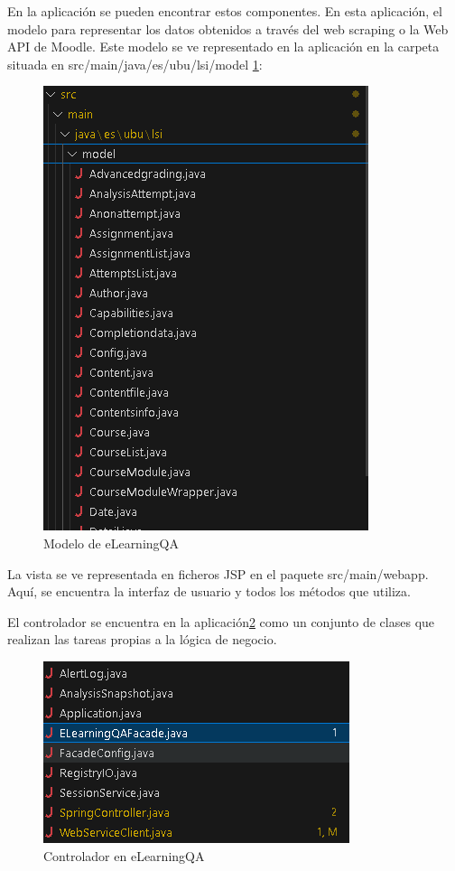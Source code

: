 En la aplicación se pueden encontrar estos componentes. En esta aplicación, el modelo para representar los datos obtenidos a través del web scraping o la Web API de Moodle. Este modelo se ve representado en la aplicación en la carpeta situada en src/main/java/es/ubu/lsi/model \ref{fig:modelo}:

\begin{figure}[H]
    \centering
    \includegraphics[width=0.6\linewidth]{img/modelo-elearningqa.png}
    \caption{Modelo de eLearningQA}
    \label{fig:modelo}
\end{figure}

La vista se ve representada en ficheros JSP en el paquete src/main/webapp. Aquí, se encuentra la interfaz de usuario y todos los métodos que utiliza. 

El controlador se encuentra en la aplicación\ref{fig:controlador} como un conjunto de clases que realizan las tareas propias a la lógica de negocio.

\begin{figure}[H]
    \centering
    \includegraphics[width=0.5\linewidth]{img/controlador.png}
    \caption{Controlador en eLearningQA}
    \label{fig:controlador}
\end{figure}

